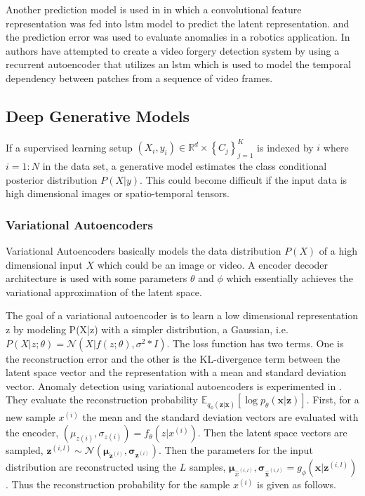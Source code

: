 \documentclass[a4paper,12pt]{report}
\begin{document}
\begin{itemize}
Another prediction model is used in \cite{62} in which a convolutional feature representation was fed into \gls{lstm} model to predict the latent representation. and the prediction error was used to evaluate anomalies in a robotics application. In \cite{63} authors have attempted to create a video forgery detection system by using a recurrent autoencoder that utilizes an \gls{lstm} which is used to model the temporal dependency between patches from a sequence of video frames. 



\subsection{Deep Generative Models}

If a supervised learning setup $\left( X _ { i } , y _ { i } \right) \in \mathbb { R } ^ { d } \times \left\{ C _ { j } \right\} _ { j = 1 } ^ { K }$ is indexed by $i$ where $i = 1:N$ in the data set, a generative model estimates the class conditional posterior distribution $P(X|y)$. This could become difficult if the input data is high dimensional images or spatio-temporal tensors. 

\subsubsection{Variational Autoencoders}

Variational Autoencoders basically models the data distribution $P(X)$ of a high dimensional input $X$ which could be an image or video. A encoder decoder architecture is used with some parameters $\theta$ and $\phi$ which essentially achieves the variational approximation of the  latent space. 

The goal of a variational autoencoder is to learn a low dimensional representation z by modeling P(X|z) with a simpler distribution, a Gaussian, i.e. $P ( X | z ; \theta ) = \mathscr { N } ( X | f ( z ; \theta ) , \sigma ^ { 2 } * I )$. The loss function has two terms. One is the reconstruction error and the other is the KL-divergence term between the latent space vector and the representation with a mean and standard deviation vector. 
Anomaly detection using variational autoencoders is experimented in \cite{64}. They evaluate the reconstruction probability $\mathbb { E } _ { q _ { \phi } ( \mathbf { z } | \mathbf { x } ) } \left[ \log p _ { \theta } ( \mathbf { x } | \mathbf { z } ) \right]$. 
First, for a new sample $x^{(i)}$ the mean and the standard deviation vectors are evaluated with the encoder, $(\mu_{z{(i)}}, \sigma_{z{(i)}}) = f_\theta(z|x^{(i)})$. Then the latent space vectors are sampled, $\boldsymbol { z } ^ { ( i , l ) } \sim \mathscr { N } \left( \boldsymbol { \mu } _ { \boldsymbol { z } ^ { ( i ) } } , \boldsymbol { \sigma } _ { \boldsymbol { z } ^ { ( i ) } } \right)$. Then the parameters for the input distribution are reconstructed using the $L$ samples, $\boldsymbol { \mu } _ { \hat { x } ^ { ( i , l ) } } , \boldsymbol { \sigma } _ { \hat { \mathbf { x } } ^ { ( i , l ) } } = g _ { \phi } ( \mathbf { x } | \mathbf { z } ^ { ( i , l ) } )$. Thus the reconstruction probability for the sample $x^(i)$ is given as follows.


\end{itemize}
\end{document}
